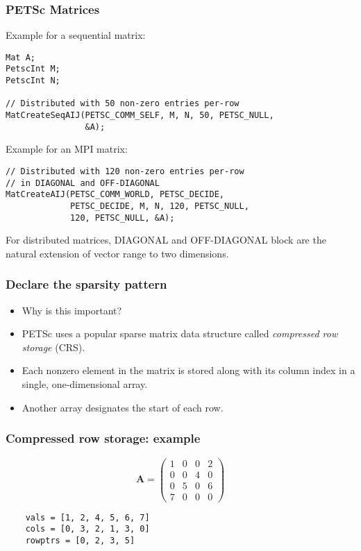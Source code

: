 \begin{frame}[fragile]
  \frametitle{PETSc Matrices}

Example for a sequential matrix:
\begin{lstlisting}[style=c]
Mat A;
PetscInt M;
PetscInt N;

// Distributed with 50 non-zero entries per-row
MatCreateSeqAIJ(PETSC_COMM_SELF, M, N, 50, PETSC_NULL,
                &A);
\end{lstlisting}

Example for an MPI matrix:
\begin{lstlisting}[style=c]
// Distributed with 120 non-zero entries per-row 
// in DIAGONAL and OFF-DIAGONAL
MatCreateAIJ(PETSC_COMM_WORLD, PETSC_DECIDE, 
             PETSC_DECIDE, M, N, 120, PETSC_NULL,
             120, PETSC_NULL, &A);

\end{lstlisting}
For distributed matrices, DIAGONAL and OFF-DIAGONAL block are the natural extension of vector range to two dimensions.

\end{frame}

\begin{frame}
  \frametitle{Declare the sparsity pattern}
  \begin{itemize}
  \item Why is this important?
  \item PETSc uses a popular sparse matrix data structure called
    \emph{compressed row storage} (CRS).
  \item Each nonzero element in the matrix is stored along with its column index
    in a single, one-dimensional array.
  \item Another array designates the start of each row.
  \end{itemize}
\end{frame}

\begin{frame}[fragile]
  \frametitle{Compressed row storage: example}
  \[
    \bm A = \begin{pmatrix}
      1 & 0 & 0 & 2 \\ 0 & 0 & 4 & 0 \\ 0 & 5 & 0 & 6 \\ 7 & 0 & 0 & 0
    \end{pmatrix}
  \]
  \begin{lstlisting}
    vals = [1, 2, 4, 5, 6, 7]
    cols = [0, 3, 2, 1, 3, 0]
    rowptrs = [0, 2, 3, 5]
  \end{lstlisting}
\end{frame}

